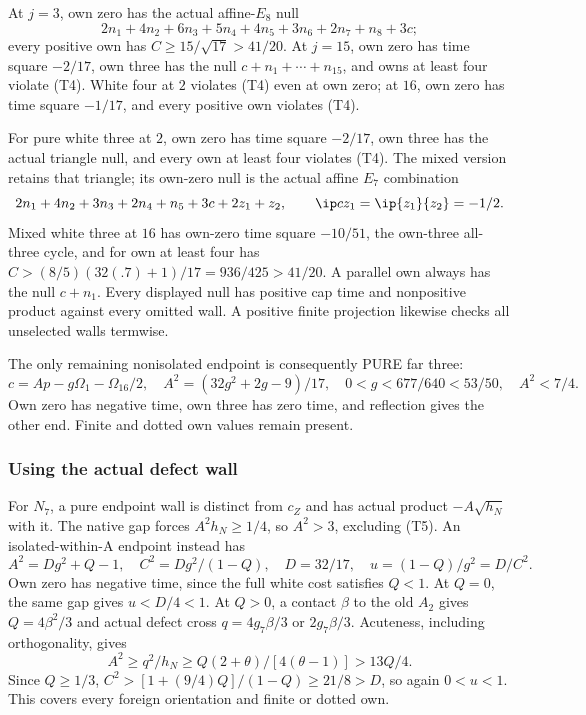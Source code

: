 At \(j=3\), own zero has the actual affine-\(E_8\) null
\[
 2n_1+4n_2+6n_3+5n_4+4n_5+3n_6+2n_7+n_8+3c;
\]
every positive own has \(C\ge15/\sqrt{17}>41/20\).
At \(j=15\), own zero has time square \(-2/17\), own three
has the null \(c+n_1+\cdots+n_{15}\), and owns at least four
violate (T4).  White four at \(2\) violates (T4) even at own zero;
at \(16\), own zero has time square \(-1/17\), and every
positive own violates (T4).

For pure white three at \(2\), own zero has time square \(-2/17\),
own three has the actual triangle null, and every own at least four
violates (T4).  The mixed version retains that triangle; its own-zero
null is the actual affine \(E_7\) combination
\[
 2n_1+4n_2+3n_3+2n_4+n_5+3c+2z_1+z_2,
 \qquad \ip c{z_1}=\ip{z_1}{z_2}=-1/2.
\]
Mixed white three at \(16\) has own-zero time square \(-10/51\),
the own-three all-three cycle, and for own at least four has
\(C>(8/5)(32(.7)+1)/17=936/425>41/20\).
A parallel own always has the null \(c+n_1\).
Every displayed null has positive cap time and nonpositive product
against every omitted wall.  A positive finite projection likewise
checks all unselected walls termwise.

The only remaining nonisolated endpoint is consequently PURE far three:
\[
 c=Ap-g\Omega_1-\Omega_{16}/2,\quad
 A^2=(32g^2+2g-9)/17,
 \quad 0<g<677/640<53/50,\quad A^2<7/4.              \tag{T5}
\]
Own zero has negative time, own three has zero time, and reflection
gives the other end.  Finite and dotted own values remain present.

\subsubsection{Using the actual defect wall}
For \(N_7\), a pure endpoint wall is distinct from \(c_Z\) and
has actual product \(-A\sqrt{h_N}\) with it.  The native gap
forces \(A^2h_N\ge1/4\), so \(A^2>3\), excluding (T5).
An isolated-within-A endpoint instead has
\[
 A^2=Dg^2+Q-1,\quad C^2=Dg^2/(1-Q),\quad
 D=32/17,\quad u=(1-Q)/g^2=D/C^2.
\]
Own zero has negative time, since the full white cost satisfies \(Q<1\).
At \(Q=0\), the same gap gives \(u<D/4<1\).
At \(Q>0\), a contact \(\beta\) to the old \(A_2\) gives
\(Q=4\beta^2/3\) and actual defect cross
\(q=4g_7\beta/3\) or \(2g_7\beta/3\).
Acuteness, including orthogonality, gives
\[
 A^2\ge q^2/h_N\ge Q(2+\theta)/[4(\theta-1)]>13Q/4.
\]
Since \(Q\ge1/3\),
\(C^2>[1+(9/4)Q]/(1-Q)\ge21/8>D\), so again \(0<u<1\).
This covers every foreign orientation and finite or dotted own.


